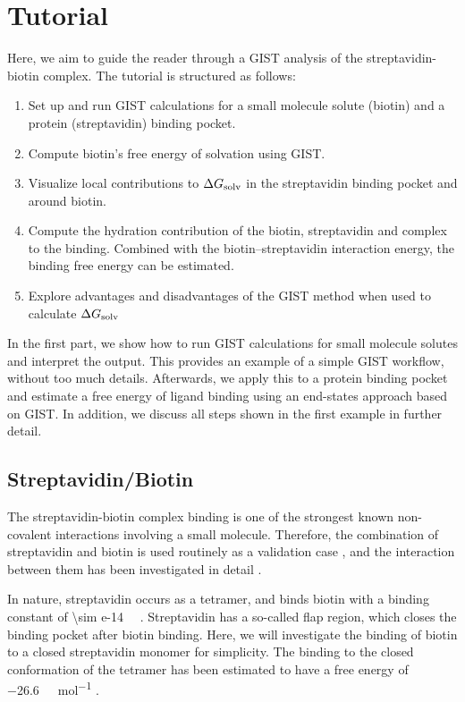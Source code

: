 \documentclass[9pt,tutorial]{livecoms}
\newcommand{\dgsolv}{\Delta G_\textup{solv}}
\begin{document}
\pagebreak
\section{Tutorial}
Here, we aim to guide the reader through a GIST analysis of the streptavidin-biotin complex.
The tutorial is structured as follows:
\begin{enumerate}
	\item Set up and run GIST calculations for a small molecule solute (biotin) and a protein (streptavidin) binding pocket.
	\item Compute biotin's free energy of solvation using GIST.
	\item Visualize local contributions to $\dgsolv$ in the streptavidin binding pocket and around biotin.
	\item Compute the hydration contribution of the biotin, streptavidin and complex to the binding. Combined with the biotin--streptavidin interaction energy, the binding free energy can be estimated.
	\item Explore advantages and disadvantages of the GIST method when used to calculate  $\dgsolv$
\end{enumerate}
In the first part, we show how to run GIST calculations for small molecule solutes and interpret the output. This provides an example of a simple GIST workflow, without too much details.
Afterwards, we apply this to a protein binding pocket and estimate a free energy of ligand binding using an end-states approach based on GIST. In addition, we discuss all steps shown in the first example in further detail. 


\subsection{Streptavidin/Biotin}
The streptavidin-biotin complex binding is one of the strongest known non-covalent interactions involving a small molecule.
Therefore, the combination of streptavidin and biotin is used routinely as a validation case \cite{Dundas2013-streptavidin-review}, and the interaction between them has been investigated in detail \cite{McConnell2021-biotin}.

\newcommand{\appr}{{\mathord{\sim}}}
In nature, streptavidin occurs as a tetramer, and binds biotin with a binding constant of \SI{\sim e-14}{\per\Molar} \cite{Dundas2013-streptavidin-review}.
Streptavidin has a so-called flap region, which closes the binding pocket after biotin binding.
Here, we will investigate the binding of biotin to a closed streptavidin monomer for simplicity.
The binding to the closed conformation of the tetramer has been estimated to have a free energy of \SI{-26.6}{\kilo\calorie\per\mol} \cite{Bansal2018-biotin}.
\end{document}
